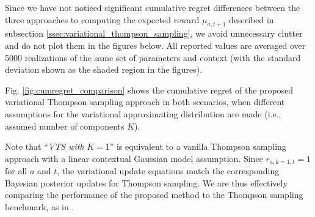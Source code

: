 \documentclass{article}
\newcommand{\ie}{i.e., }
\begin{document}
Since we have not noticed significant cumulative regret differences between the three approaches to computing the expected reward $\mu_{a,t+1}$ described in subsection \ref{ssec:variational_thompson_sampling}, we avoid unnecessary clutter and do not plot them in the figures below. All reported values are averaged over 5000 realizations of the same set of parameters and context (with the standard deviation shown as the shaded region in the figures).

Fig. \ref{fig:cumregret_comparison} shows the cumulative regret of the proposed variational Thompson sampling approach in both scenarios, when different assumptions for the variational approximating distribution are made (\ie assumed number of components $K$).

Note that ``\textit{VTS with }$K=1$'' is equivalent to a vanilla Thompson sampling approach with a linear contextual Gaussian model assumption. Since $r_{a,k=1,t}=1$ for all $a$ and $t$, the variational update equations match the corresponding Bayesian posterior updates for Thompson sampling. We are thus effectively comparing the performance of the proposed method to the Thompson sampling benchmark, as in \cite{j-Agrawal2012}.
\end{document}

